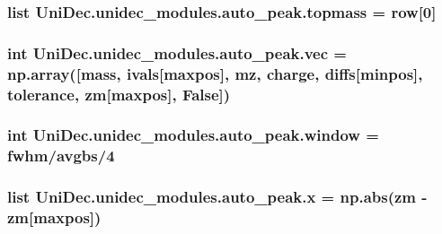 \subsubsection[{topmass}]{\setlength{\rightskip}{0pt plus 5cm}list Uni\+Dec.\+unidec\+\_\+modules.\+auto\+\_\+peak.\+topmass = {\bf row}\mbox{[}0\mbox{]}}\label{namespace_uni_dec_1_1unidec__modules_1_1auto__peak_a56352c73bb6345e6e0f69ca4f52b51b5}
\hypertarget{namespace_uni_dec_1_1unidec__modules_1_1auto__peak_adeb45617daaa2b308f5578545c0e9bf6}{}
\subsubsection[{vec}]{\setlength{\rightskip}{0pt plus 5cm}int Uni\+Dec.\+unidec\+\_\+modules.\+auto\+\_\+peak.\+vec = np.\+array(\mbox{[}{\bf mass}, {\bf ivals}\mbox{[}{\bf maxpos}\mbox{]}, {\bf mz}, {\bf charge}, {\bf diffs}\mbox{[}{\bf minpos}\mbox{]}, {\bf tolerance}, {\bf zm}\mbox{[}{\bf maxpos}\mbox{]}, False\mbox{]})}\label{namespace_uni_dec_1_1unidec__modules_1_1auto__peak_adeb45617daaa2b308f5578545c0e9bf6}
\hypertarget{namespace_uni_dec_1_1unidec__modules_1_1auto__peak_ac99568789a44a90c12609fcdfde18bef}{}
\subsubsection[{window}]{\setlength{\rightskip}{0pt plus 5cm}int Uni\+Dec.\+unidec\+\_\+modules.\+auto\+\_\+peak.\+window = fwhm/{\bf avgbs}/4}\label{namespace_uni_dec_1_1unidec__modules_1_1auto__peak_ac99568789a44a90c12609fcdfde18bef}
\hypertarget{namespace_uni_dec_1_1unidec__modules_1_1auto__peak_abc1d33a8ad225f476c035155a8b56834}{}
\subsubsection[{x}]{\setlength{\rightskip}{0pt plus 5cm}list Uni\+Dec.\+unidec\+\_\+modules.\+auto\+\_\+peak.\+x = np.\+abs({\bf zm} -\/ {\bf zm}\mbox{[}{\bf maxpos}\mbox{]})}\label{namespace_uni_dec_1_1unidec__modules_1_1auto__peak_abc1d33a8ad225f476c035155a8b56834}
\hypertarget{namespace_uni_dec_1_1unidec__modules_1_1auto__peak_a0ba2e98c339056b40fbed6c28f680c68}{}
